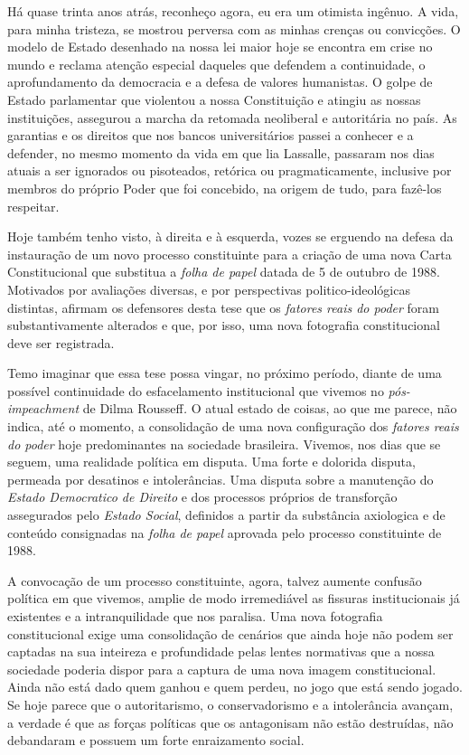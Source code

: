 Há quase trinta anos atrás, reconheço agora, eu era um otimista ingênuo.
A vida, para minha tristeza, se mostrou perversa com as minhas crenças
ou convicções. O modelo de Estado desenhado na nossa lei maior hoje se
encontra em crise no mundo e reclama atenção especial daqueles que
defendem a continuidade, o aprofundamento da democracia e a defesa de
valores humanistas. O golpe de Estado parlamentar que violentou a nossa
Constituição e atingiu as nossas instituições, assegurou a marcha da
retomada neoliberal e autoritária no país. As garantias e os direitos
que nos bancos universitários passei a conhecer e a defender, no mesmo
momento da vida em que lia Lassalle, passaram nos dias atuais a ser
ignorados ou pisoteados, retórica ou pragmaticamente, inclusive por
membros do próprio Poder que foi concebido, na origem de tudo, para
fazê-los respeitar.

Hoje também tenho visto, à direita e à esquerda, vozes se erguendo na
defesa da instauração de um novo processo constituinte para a criação de
uma nova Carta Constitucional que substitua a \emph{folha de papel}
datada de 5 de outubro de 1988. Motivados por avaliações diversas, e por
perspectivas politico-ideológicas distintas, afirmam os defensores desta
tese que os \emph{fatores reais do poder} foram substantivamente
alterados e que, por isso, uma nova fotografia constitucional deve ser
registrada.

Temo imaginar que essa tese possa vingar, no próximo período, diante de
uma possível continuidade do esfacelamento institucional que vivemos no
\emph{pós-impeachment} de Dilma Rousseff\emph{.} O atual estado de
coisas, ao que me parece, não indica, até o momento, a consolidação de
uma nova configuração dos \emph{fatores reais do poder} hoje
predominantes na sociedade brasileira. Vivemos, nos dias que se seguem,
uma realidade política em disputa. Uma forte e dolorida disputa,
permeada por desatinos e intolerâncias. Uma disputa sobre a manutenção
do \emph{Estado Democratico de Direito} e dos processos próprios de
transforção assegurados pelo \emph{Estado Social}, definidos a partir da
substância axiologica e de conteúdo consignadas na \emph{folha de papel}
aprovada pelo processo constituinte de 1988.

A convocação de um processo constituinte, agora, talvez aumente confusão
política em que vivemos, amplie de modo irremediável as fissuras
institucionais já existentes e a intranquilidade que nos paralisa. Uma
nova fotografia constitucional exige uma consolidação de cenários que
ainda hoje não podem ser captadas na sua inteireza e profundidade pelas
lentes normativas que a nossa sociedade poderia dispor para a captura de
uma nova imagem constitucional. Ainda não está dado quem ganhou e quem
perdeu, no jogo que está sendo jogado. Se hoje parece que o
autoritarismo, o conservadorismo e a intolerância avançam, a verdade é
que as forças políticas que os antagonisam não estão destruídas, não
debandaram e possuem um forte enraizamento social.

